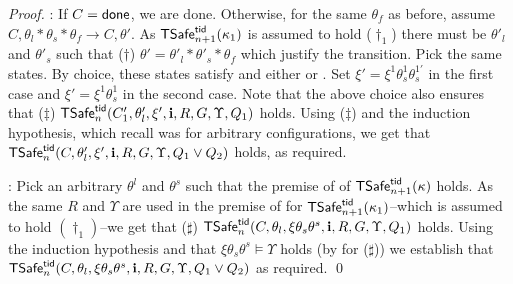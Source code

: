 \begin{proof}
: 
If $C={\sf done}$, we are done.
Otherwise, 
for the same $\theta_f$ as before, 
assume
$C, \theta_l*\theta_s*\theta_f \rightarrow C,\theta'$.
As ${\sf TSafe}^{{\sf tid}}_{n+1}(\kappa_1)$ is assumed to hold ($\dag_1$) 
there must be 
$\theta'_l$  and $\theta'_s$  such that ($\dag$) $\theta'=\theta'_l*\theta'_s*\theta_f$ 
which justify the transition. 
Pick the same states.
By choice, these states satisfy  and either  
 or .
Set $\xi'=\xi^1\theta^1_s\theta^{1'}_s$  in the first case and $\xi'=\xi^1\theta^1_s$ in the second case.
Note that the above choice also ensures that ($\ddag$)  
${\sf TSafe}^{{\sf tid}}_n(C'_1, \theta'_l,\xi',{\bf i},R,G,\Upsilon, Q_1)$ holds.
Using ($\ddag$) and the induction hypothesis, which recall was for arbitrary configurations,
we get that 
${\sf TSafe}^{{\sf tid}}_n(C, \theta'_l,\xi',{\bf i},R,G,\Upsilon, Q_1 \lor Q_2)$ holds, as required.

: 
Pick an arbitrary $\theta^l$ and $\theta^s$ such that the 
premise of  of ${\sf TSafe}^{{\sf tid}}_{n+1}(\kappa)$ holds. 
As the same $R$ and $\Upsilon$ are used in the premise of 
 for ${\sf TSafe}^{{\sf tid}}_{n+1}(\kappa_1)$--which is assumed to 
hold $(\dag_1)$--we get that ($\sharp$)
${\sf TSafe}^{{\sf tid}}_n(C,\theta_l,\xi\theta_s\theta^s,{\bf i},R,G,\Upsilon, Q_1)$ holds.
Using the induction hypothesis and 
that
$\xi\theta_s\theta^s\vDash\Upsilon$ holds (by  for ($\sharp$))
we establish that 
${\sf TSafe}^{{\sf tid}}_n(C,\theta_l,\xi\theta_s\theta^s,{\bf i},R,G,\Upsilon, Q_1 \lor Q_2)$
as required.
\qed\end{proof}


